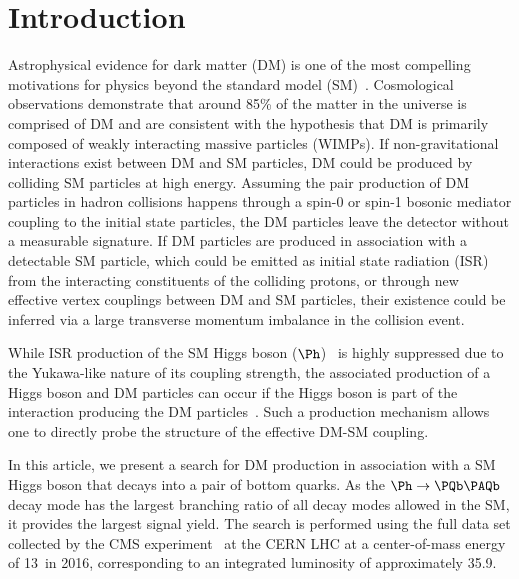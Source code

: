 \section{Introduction} \label{intro}

Astrophysical evidence for dark matter (DM) is one of the most compelling motivations for
physics beyond the standard model
(SM)~\cite{dm1,dm2,dm3}. Cosmological observations demonstrate that
around 85\% of the matter in the universe is comprised of DM
\cite{planck} and are consistent with the hypothesis that DM is primarily composed of
weakly interacting massive particles (WIMPs). If non-gravitational
interactions exist between DM and SM particles, DM could be produced
by colliding SM particles at high energy. Assuming the pair
production of DM particles in hadron collisions happens through a
spin-0 or spin-1 bosonic mediator coupling to the initial state particles, the DM particles leave the
detector without a measurable signature. If DM particles are produced in association with a detectable SM particle, which could be emitted
as initial state radiation (ISR) from the interacting constituents of the colliding protons, or through
new effective vertex couplings between DM and SM particles, their
existence could be inferred via a large transverse momentum imbalance in the collision event. 


While ISR production of the SM Higgs boson ($\Ph$)~\cite{HiggsObs_ATLAS, HiggsObs_CMS, HiggsObs_CMS_Long} is highly suppressed due to the Yukawa-like nature of its coupling strength, 
the associated production of a Higgs boson and DM particles
can occur if the
Higgs boson is part of the interaction producing the DM particles~\cite{monoHiggs3,2HDM,PhysRevD.89.075017}.
Such a production mechanism allows one to directly probe the structure of the effective DM-SM coupling.

In this article, we  present a search for DM production in association
with a SM Higgs boson that decays into a pair of bottom quarks. As the 
$\Ph\rightarrow \bb$ decay mode has the largest branching ratio of all decay modes allowed in the SM, it provides the largest signal yield. The search is performed using the full data set collected by the CMS experiment~\cite{CMSdetector} at the CERN LHC at a center-of-mass energy of 13\TeV~in 2016, corresponding to an integrated luminosity of approximately 35.9\fbinv. 

